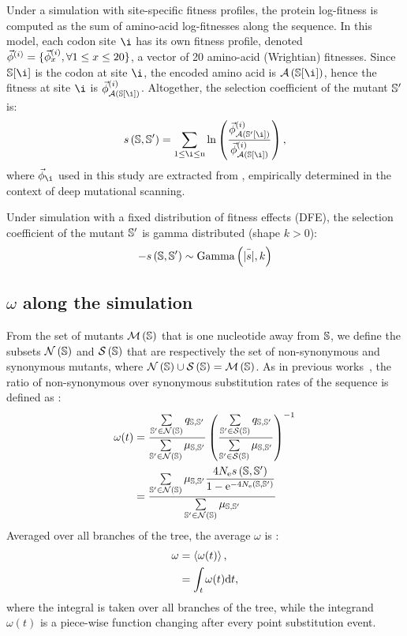 Under a simulation with site-specific fitness profiles, the protein log-fitness is computed as the sum of amino-acid log-fitnesses along the sequence.
In this model, each codon site $\i$ has its own fitness profile, denoted $\vec{\phi}^{(i)} = \{ \vec{\phi}^{(i)}_{x}, \forall 1 \leq x \leq 20 \}$, a vector of 20 amino-acid (Wrightian) fitnesses.
Since $\Seqi[ \i ]$ is the codon at site $\i$, the encoded amino acid is $\aaMap \left( \Seqi[ \i ] \right)$, hence the fitness at site $\i$ is $\Profile^{(i)}_{\aaMap \left( \Seqi[ \i ] \right)}$.
Altogether, the selection coefficient of the mutant $\mathbb{S}'$ is:
\begin{equation}
    s \left( \Seqi,\Seqj\right) = \sum\limits_{1 \leq \i \leq \Nsite} \ln \left( \dfrac{\Profile^{(i)}_{\aaMap \left( \Seqj[ \i ] \right)}}{\Profile^{(i)}_{\aaMap \left( \Seqi[ \i ] \right)}} \right),
\end{equation}
where $\Profile_{\i}$ used in this study are extracted from \citet{Bloom2017}, empirically determined in the context of deep mutational scanning.

Under simulation with a fixed distribution of fitness effects (\acrshort{DFE}), the selection coefficient of the mutant $\mathbb{S}'$ is gamma distributed (shape $k > 0$):
\begin{equation}
    - s \left( \mathbb{S},\mathbb{S}'\right) \sim \text{Gamma} \left( \bar{|s|}, k \right)
\end{equation}

\subsection{\texorpdfstring{$\omega$}{ω} along the simulation}
From the set of mutants $\mathcal{M}\left(\mathbb{S}\right)$ that is one nucleotide away from $\mathbb{S}$, we define the subsets $\mathcal{N}\left(\mathbb{S}\right)$ and $\mathcal{S}\left(\mathbb{S}\right)$ that are respectively the set of non-synonymous and synonymous mutants, where $\mathcal{N}\left(\mathbb{S}\right) \cup \mathcal{S}\left(\mathbb{S}\right) = \mathcal{M}\left(\mathbb{S}\right)$.
As in previous works~\citep{Spielman2015, DosReis2015, Jones2016}, the ratio of non-synonymous over synonymous substitution rates of the sequence is defined as :
\begin{align}
    \omega(t) &= \dfrac{\sum\limits_{\mathbb{S}' \in \mathcal{N}\left(\mathbb{S}\right)} q_{\mathbb{S}, \mathbb{S}'}}{\sum\limits_{\mathbb{S}' \in \mathcal{N}\left(\mathbb{S}\right)} \mu_{\mathbb{S}, \mathbb{S}'}} \left( \dfrac{\sum\limits_{\mathbb{S}' \in \mathcal{S}\left(\mathbb{S}\right)} q_{\mathbb{S}, \mathbb{S}'}}{\sum\limits_{\mathbb{S}' \in \mathcal{S}\left(\mathbb{S}\right)} \mu_{\mathbb{S}, \mathbb{S}'}} \right)^{-1}\\
    &= \dfrac{\sum\limits_{\mathbb{S}' \in \mathcal{N}\left(\mathbb{S}\right)} \mu_{\mathbb{S}, \mathbb{S}'} \dfrac{4 N_{\text{e}} s \left( \mathbb{S},\mathbb{S}'\right)}{{1 - \text{e}^{-4 N_{\text{e}} \left( \mathbb{S},\mathbb{S}'\right)} }}}{\sum\limits_{\mathbb{S}' \in \mathcal{N}\left(\mathbb{S}\right)} \mu_{\mathbb{S}, \mathbb{S}'}}
\end{align}
Averaged over all branches of the tree, the average $\omega$ is :
\begin{align}
    \omega & = \left\langle \omega(t) \right\rangle, \\
    & = \int_{t} \omega (t) \text{d} t,
\end{align}
where the integral is taken over all branches of the tree, while the integrand $\omega (t)$ is a piece-wise function changing after every point substitution event.
